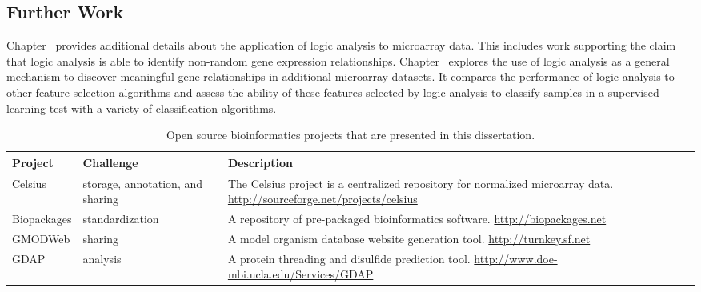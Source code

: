 \subsection{Further Work}

Chapter \XXXchapter\ provides additional details about the application
of logic analysis to microarray data.  This includes work supporting the claim
that logic analysis is able to identify non-random gene expression
relationships.  Chapter \XXXchapter\ explores the use of logic analysis
as a general mechanism to discover meaningful gene relationships in additional
microarray datasets.  It compares the performance of logic analysis to other
feature selection algorithms and assess the ability of these features selected by
logic analysis to classify samples in a supervised learning test with a variety
of classification algorithms.





\newpage



\begin{table}[p]
\caption[Open source bioinformatics projects]{Open source bioinformatics projects that are presented in this dissertation.}
\label{projects}
\begin{tabular}{|l|p{3cm}|p{7cm}|}
\hline
\textbf{Project} & \textbf{Challenge} & \textbf{Description} \\
\hline
\hline
Celsius & storage, annotation, and sharing  & The Celsius project is a centralized repository for normalized microarray data. \url{http://sourceforge.net/projects/celsius} \\
Biopackages & standardization & A repository of pre-packaged bioinformatics software. \url{http://biopackages.net} \\
GMODWeb & sharing & A model organism database website generation tool. \url{http://turnkey.sf.net} \\
GDAP & analysis & A protein threading and disulfide prediction tool. \url{http://www.doe-mbi.ucla.edu/Services/GDAP}\\
\hline
\end{tabular}
\end{table}

\clearpage




